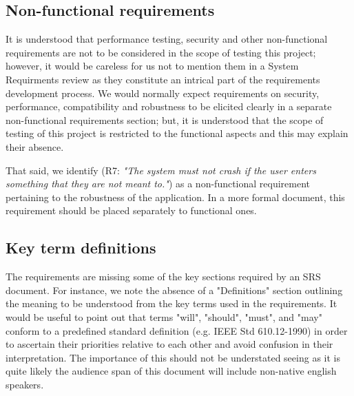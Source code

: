 \subsection{Non-functional requirements}
It is understood that performance testing, security and other non-functional requirements are not to be considered in the scope of testing this project; however, it would be careless for us not to mention them in a System Requirments review as they constitute an intrical part of the requirements development process. 
We would normally expect requirements on security, performance, compatibility and robustness to be elicited clearly in a separate non-functional requirements section; but, it is understood that the scope of testing of this project is restricted to the functional aspects and this may explain their absence. 
\par
That said, we identify (R7: \textit{"The system must not crash if the user enters something that they are not meant to."}) as a non-functional requirement pertaining to the robustness of the application. In a more formal document, this requirement should be placed separately to functional ones.    
%
\par

\subsection{Key term definitions}
The requirements are missing some of the key sections required by an SRS document.
For instance, we note the absence of a "Definitions" section outlining the meaning to be understood from the key terms used in the requirements.
It would be useful to point out that terms "will", "should", "must", and "may" conform to a predefined standard definition (e.g. IEEE Std 610.12-1990) in order to ascertain their priorities relative to each other and avoid confusion in their interpretation. 
The importance of this should not be understated seeing as it is quite likely the audience span of this document will include non-native english speakers. 

